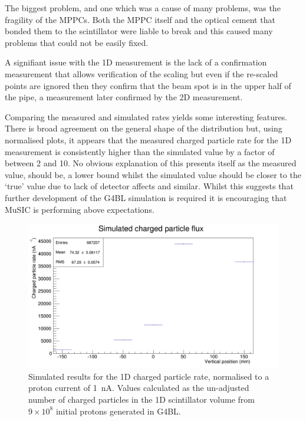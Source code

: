 The biggest problem, and one which was a cause of many problems, was the fragility of the MPPCs. Both the MPPC itself and the optical cement that bonded them to the scintillator were liable to break and this caused many problems that could not be easily fixed. 

A signifiant issue with the 1D measurement is the lack of a confirmation measurement that allows verification of the scaling but even if the re-scaled points are ignored then they confirm that the beam spot is in the upper half of the pipe, a measurement later confirmed by the 2D measurement. 

Comparing the measured and simulated rates yields some interesting features. There is broad agreement on the general shape of the distribution but, using normalised plots, it appears that the measured charged particle rate for the 1D measurement is consistently higher than the simulated value by a factor of between 2 and 10. No obvious explanation of this presents itself as the measured value, should be, a lower bound whilst the simulated value should be closer to the `true' value due to lack of detector affects and similar. Whilst this suggests that further development of the G4BL simulation is required it is encouraging that MuSIC is performing above expectations.

\begin{figure}[hptb] 
  \centering
    \includegraphics[width=.9\textwidth]{images/plot_generating_scripts/sim_1d_charged_flux.png}
  \caption{Simulated results for the 1D charged particle rate, normalised to a proton current of 1~nA. Values calculated as the un-adjusted number of charged particles in the 1D scintillator volume from \( 9\times10^8 \) initial protons generated in G4BL.}
  \label{fig:sim_1d_charged_flux}
\end{figure}

